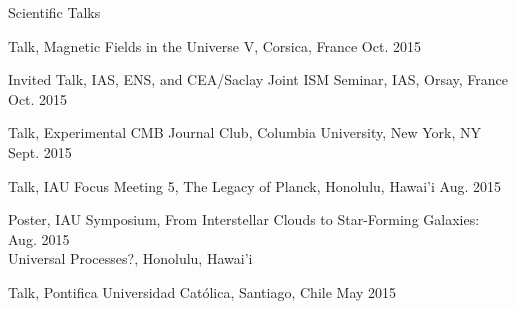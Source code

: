 \documentclass{resume_clark} %
\newcommand{\hi}{H{\sc i}~}
\begin{document}
\begin{rSection}{Scientific Talks}
\begin{etaremune}
\item Talk, Magnetic Fields in the Universe V, Corsica, France \hfill {Oct. 2015}

\item Invited Talk, IAS, ENS, and CEA/Saclay Joint ISM Seminar, IAS, Orsay, France \hfill {Oct. 2015}

\item Talk, Experimental CMB Journal Club, Columbia University, New York, NY \hfill {Sept. 2015}

\item Talk, IAU Focus Meeting 5, The Legacy of Planck, Honolulu, Hawai'i \hfill {Aug. 2015}

\item Poster, IAU Symposium, From Interstellar Clouds to Star-Forming Galaxies: \hfill {Aug. 2015}\\Universal Processes?, Honolulu, Hawai'i

\item Talk, Pontifica Universidad Cat\'olica, Santiago, Chile \hfill {May 2015}


\end{etaremune}
\end{rSection}
\end{document}
